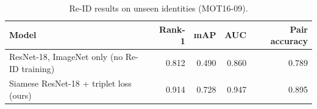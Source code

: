 \begin{table}[h]
\caption{Re-ID results on unseen identities (MOT16-09).}
\label{tab:reid}
\begin{tabular}{lrrrr}
\toprule
Model & Rank-1 & mAP & AUC & Pair accuracy \\
\midrule
ResNet-18, ImageNet only (no Re-ID training) & 0.812 & 0.490 & 0.860 & 0.789 \\
Siamese ResNet-18 + triplet loss (ours) & 0.914 & 0.728 & 0.947 & 0.895 \\
\bottomrule
\end{tabular}
\end{table}
